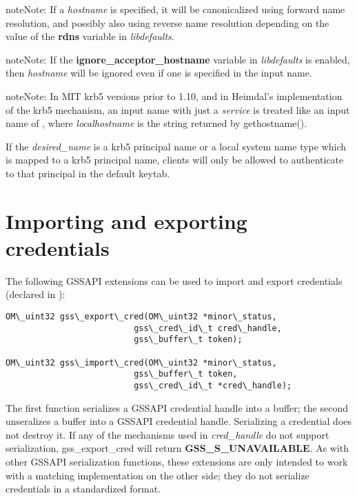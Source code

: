 \documentclass[letterpaper,10pt,english]{sphinxmanual}
\begin{document}
\begin{notice}{note}{Note:}
If a \emph{hostname} is specified, it will be canonicalized
using forward name resolution, and possibly also using
reverse name resolution depending on the value of the
\textbf{rdns} variable in \emph{libdefaults}.
\end{notice}

\begin{notice}{note}{Note:}
If the \textbf{ignore\_acceptor\_hostname} variable in
\emph{libdefaults} is enabled, then \emph{hostname} will be
ignored even if one is specified in the input name.
\end{notice}

\begin{notice}{note}{Note:}
In MIT krb5 versions prior to 1.10, and in Heimdal's
implementation of the krb5 mechanism, an input name with
just a \emph{service} is treated like an input name of
, where \emph{localhostname} is the
string returned by gethostname().
\end{notice}

If the \emph{desired\_name} is a krb5 principal name or a local system name
type which is mapped to a krb5 principal name, clients will only be
allowed to authenticate to that principal in the default keytab.


\section{Importing and exporting credentials}
\label{appdev/gssapi:importing-and-exporting-credentials}
The following GSSAPI extensions can be used to import and export
credentials (declared in ):

\begin{Verbatim}[commandchars=\\\{\}]
OM\_uint32 gss\_export\_cred(OM\_uint32 *minor\_status,
                          gss\_cred\_id\_t cred\_handle,
                          gss\_buffer\_t token);

OM\_uint32 gss\_import\_cred(OM\_uint32 *minor\_status,
                          gss\_buffer\_t token,
                          gss\_cred\_id\_t *cred\_handle);
\end{Verbatim}

The first function serializes a GSSAPI credential handle into a
buffer; the second unseralizes a buffer into a GSSAPI credential
handle.  Serializing a credential does not destroy it.  If any of the
mechanisms used in \emph{cred\_handle} do not support serialization,
gss\_export\_cred will return \textbf{GSS\_S\_UNAVAILABLE}.  As with other
GSSAPI serialization functions, these extensions are only intended to
work with a matching implementation on the other side; they do not
serialize credentials in a standardized format.
\end{document}
